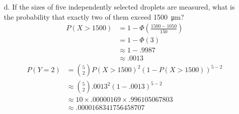 \documentclass[letterpaper,12pt]{article}
\begin{document}
\begin{enumerate}
\begin{enumerate}
        How would you characterize the smallest \qty{2}{\percent} of all droplets?
        \begin{align*}
          P(X \le x) &= .02 \\
          P\left(Z \le z = \frac{x - 1050}{150}\right) &= .02
        \end{align*}
        According to Appendix A.3, $z \approx -2.054$. Thus,
        \begin{align*}
          z &\approx -2.054 \\
          \frac{x - 1050}{150} &\approx -2.054 \\
          x - 1050 &\approx -308.1 \\
          x &\approx 741.9
        \end{align*}
        The smallest \qty{2}{\percent} of all droplets are less than or equal to about \qty{741.9}{\micro\meter} in size.
      \item[d.]
        If the sizes of five independently selected droplets are measured, what is the probability that exactly two of them exceed \qty{1500}{\micro\meter}?
        \begin{align*}
          P(X > 1500) &= 1 - \Phi\left(\frac{1500 - 1050}{150}\right) \\
          &= 1 - \Phi(3) \\
          &\approx 1 - .9987 \\
          &\approx .0013
        \end{align*}
        \begin{align*}
          P(Y = 2) &= \binom{5}{2} P(X > 1500)^{2} (1 - P(X > 1500))^{5 - 2} \\
          &\approx \binom{5}{2} .0013^{2} (1 - .0013)^{5 - 2} \\
          &\approx 10 \times .00000169 \times .996105067803 \\
          &\approx .0000168341756458707
        \end{align*}
    \end{enumerate}
\end{enumerate}
\end{document}
